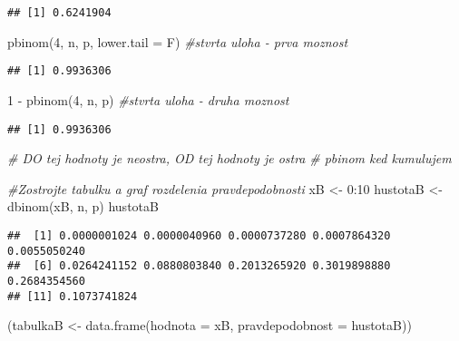 \documentclass[
]{article}
\newenvironment{Shaded}{\begin{snugshade}}{\end{snugshade}}
\newcommand{\AttributeTok}[1]{\textcolor[rgb]{0.77,0.63,0.00}{#1}}
\newcommand{\CommentTok}[1]{\textcolor[rgb]{0.56,0.35,0.01}{\textit{#1}}}
\newcommand{\DecValTok}[1]{\textcolor[rgb]{0.00,0.00,0.81}{#1}}
\newcommand{\FunctionTok}[1]{\textcolor[rgb]{0.00,0.00,0.00}{#1}}
\newcommand{\NormalTok}[1]{#1}
\newcommand{\OtherTok}[1]{\textcolor[rgb]{0.56,0.35,0.01}{#1}}
\newcommand{\SpecialCharTok}[1]{\textcolor[rgb]{0.00,0.00,0.00}{#1}}
\begin{document}
\begin{verbatim}
## [1] 0.6241904
\end{verbatim}

\begin{Shaded}
\begin{Highlighting}[]
\FunctionTok{pbinom}\NormalTok{(}\DecValTok{4}\NormalTok{, n, p, }\AttributeTok{lower.tail =}\NormalTok{ F) }\CommentTok{\#stvrta uloha {-} prva moznost}
\end{Highlighting}
\end{Shaded}

\begin{verbatim}
## [1] 0.9936306
\end{verbatim}

\begin{Shaded}
\begin{Highlighting}[]
\DecValTok{1} \SpecialCharTok{{-}} \FunctionTok{pbinom}\NormalTok{(}\DecValTok{4}\NormalTok{, n, p) }\CommentTok{\#stvrta uloha {-} druha moznost}
\end{Highlighting}
\end{Shaded}

\begin{verbatim}
## [1] 0.9936306
\end{verbatim}

\begin{Shaded}
\begin{Highlighting}[]
\CommentTok{\# DO tej hodnoty je neostra, OD tej hodnoty je ostra}
\CommentTok{\# pbinom ked kumulujem}

\CommentTok{\#Zostrojte tabulku a graf rozdelenia pravdepodobnosti}
\NormalTok{xB }\OtherTok{\textless{}{-}} \DecValTok{0}\SpecialCharTok{:}\DecValTok{10}
\NormalTok{hustotaB }\OtherTok{\textless{}{-}} \FunctionTok{dbinom}\NormalTok{(xB, n, p)}
\NormalTok{hustotaB}
\end{Highlighting}
\end{Shaded}

\begin{verbatim}
##  [1] 0.0000001024 0.0000040960 0.0000737280 0.0007864320 0.0055050240
##  [6] 0.0264241152 0.0880803840 0.2013265920 0.3019898880 0.2684354560
## [11] 0.1073741824
\end{verbatim}

\begin{Shaded}
\begin{Highlighting}[]
\NormalTok{(tabulkaB }\OtherTok{\textless{}{-}} \FunctionTok{data.frame}\NormalTok{(}\AttributeTok{hodnota =}\NormalTok{ xB, }\AttributeTok{pravdepodobnost =}\NormalTok{ hustotaB))}
\end{Highlighting}
\end{Shaded}
\end{document}
